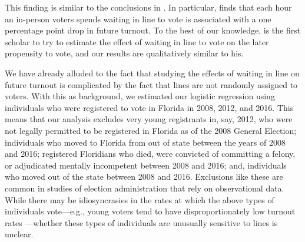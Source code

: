 \documentclass[12pt,titlepage]{article}
\begin{document}

This finding is similar to the conclusions in
\citet{pettigrew:longlinesminorityprecincts}.  In particular,
\citeauthor{pettigrew:longlinesminorityprecincts} finds that each hour
an in-person voters spends waiting in line to vote is associated with
a one percentage point drop in future turnout.  To the best of our
knowledge, \citeauthor{pettigrew:longlinesminorityprecincts} is the
first scholar to try to estimate the effect of waiting in line to vote
on the later propensity to vote, and our results are qualitatively
similar to his.

We have already alluded to the fact that studying the effects of
waiting in line on future turnout is complicated by the fact that
lines are not randomly assigned to voters.  With this as background,
we estimated our logistic regression using individuals who were
registered to vote in Florida in 2008, 2012, and 2016.  This means
that our analysis excludes very young registrants in, say, 2012, who
were not legally permitted to be registered in Florida as of the 2008
General Election; individuals who moved to Florida from out of state
between the years of 2008 and 2016; registered Floridians who died,
were convicted of committing a felony, or adjudicated mentally
incompetent between 2008 and 2016; and, individuals who moved out of
the state between 2008 and 2016.  Exclusions like these are common in
studies of election administration that rely on observational data.
While there may be idiosyncrasies in the rates at which the above
types of individuals vote---e.g., young voters tend to have
disproportionately low turnout rates
\citep{shinosmith:registrationtiming}---whether these types of
individuals are unusually sensitive to lines is unclear.  

\end{document}
